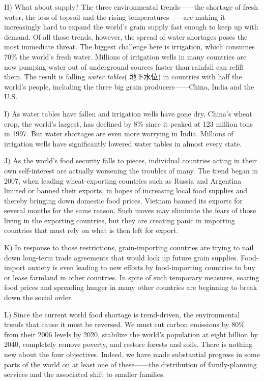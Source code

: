 \documentclass[UTF8,11pt]{ctexart}
\begin{document}
H) What about supply? The three environmental trends——the shortage of fresh water, the loss of topsoil and the rising temperatures——are making it increasingly hard to expand the world’s grain supply fast enough to keep up with demand. Of all those trends, however, the spread of water shortages poses the most immediate threat. The biggest challenge here is irrigation, which consumes 70\% the world’s fresh water. Millions of irrigation wells in many countries are now pumping water out of underground sources faster than rainfall can refill them. The result is falling\textit{ water tables}( 地下水位) in countries with half the world’s people, including the three big grain producers——China, India and the U.S.


I) As water tables have fallen and irrigation wells have gone dry, China’s wheat crop, the world’s largest, has declined by 8\% since it peaked at 123 million tons in 1997. But water shortages are even more worrying in India. Millions of irrigation wells have significantly lowered water tables in almost every state.


J) As the world’s food security falls to pieces, individual countries acting in their own self-interest are actually worsening the troubles of many. The trend began in 2007, when leading wheat-exporting countries such as Russia and Argentina limited or banned their exports, in hopes of increasing local food supplies and thereby bringing down domestic food prices. Vietnam banned its exports for several months for the same reason. Such moves may eliminate the fears of those living in the exporting countries, but they are creating panic in importing countries that must rely on what is then left for export.


K) In response to those restrictions, grain-importing countries are trying to nail down long-term trade agreements that would lock up future grain supplies. Food-import anxiety is even leading to new efforts by food-importing countries to buy or lease farmland in other countries. In spite of such temporary measures, soaring food prices and spreading hunger in many other countries are beginning to break down the social order.


L) Since the current world food shortage is trend-driven, the environmental trends that cause it must be reversed. We must cut carbon emissions by 80\% from their 2006 levels by 2020, stabilize the world’s population at eight billion by 2040, completely remove poverty, and restore forests and soils. There is nothing new about the four objectives. Indeed, we have made substantial progress in some parts of the world on at least one of these——the distribution of family-planning services and the associated shift to smaller families.
\end{document}
